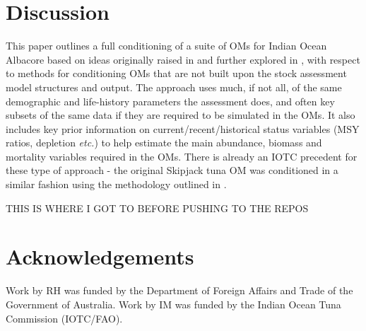 \documentclass[12pt,a4paper,twoside,times,sky,standard]{csiroreport2017}
\begin{document}
\section{Discussion}

This paper outlines a full conditioning of a suite of OMs for Indian Ocean Albacore based on ideas originally raised in \cite{om21} and further explored in \cite{om23a}, with respect to methods for conditioning OMs that are not built upon the stock assessment model structures and output. The approach uses much, if not all, of the same demographic and life-history parameters the assessment does, and often key subsets of the same data if they are required to be simulated in the OMs. It also includes key prior information on current/recent/historical status variables (MSY ratios, depletion \textit{etc.}) to help estimate the main abundance, biomass and mortality variables required in the OMs. There is already an IOTC precedent for these type of approach - the original Skipjack tuna OM was conditioned in a similar fashion \cite{skj} using the methodology outlined in \cite{fst}.

THIS IS WHERE I GOT TO BEFORE PUSHING TO THE REPOS

\section{Acknowledgements}

Work by RH was funded by the Department of Foreign Affairs and Trade of the Government of Australia. Work by IM was funded by the Indian Ocean Tuna Commission (IOTC/FAO).
\end{document}
